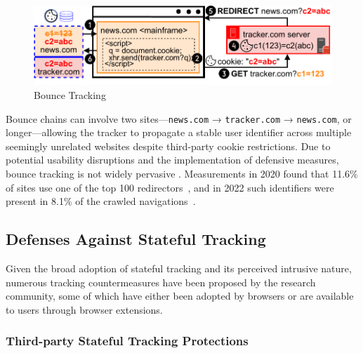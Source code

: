 \begin{figure}[htbp]
    \vspace{-2mm}
    \centering
    \includegraphics[width=1\linewidth]{figures/tracking-mechanisms-bounce-tracking.pdf}
    \caption{Bounce Tracking}
    \label{subfig:bounce-tracking}
    \vspace{-2mm}
\end{figure}

Bounce chains can involve two sites—\texttt{news.com} → \texttt{tracker.com} → \texttt{news.com}, or longer—allowing the tracker to propagate a stable user identifier across multiple seemingly unrelated websites despite third-party cookie restrictions.
%
%
Due to potential usability disruptions and the implementation of defensive measures, bounce tracking is not widely pervasive
\cite{iqbalKhaleesiBreakerAdvertising2022}.
%
Measurements in 2020 found that 11.6\% of sites use one of the top 100 redirectors~\cite{koopInDepthEvaluationRedirect2020}, and in 2022 such identifiers were present in 8.1\% of the crawled navigations~\cite{randallMeasuringUIDSmuggling2022}.


\subsection{Defenses Against Stateful Tracking}
\label{sec:stateful-defenses}
\vspace{-1mm}

Given the broad adoption of stateful tracking and its perceived intrusive nature, numerous tracking countermeasures have been proposed by the research community, some of which have either been adopted by browsers or are available to users through browser extensions.

\vspace{-4mm}
\subsubsection{Third-party Stateful Tracking Protections}

